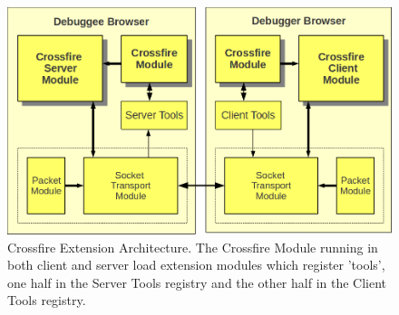 \begin{figure}[htp]
  \includegraphics  [width = 86 mm] {figures/crossfire-arch4.png}
  \caption{Crossfire Extension Architecture. The Crossfire Module running in both client and server
load extension modules which register 'tools', one half in the Server Tools registry and the other half in the Client Tools registry. }
 \label{fig:crossfire-arch}
\end{figure}
